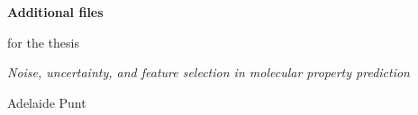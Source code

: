 \documentclass[a4paper,11pt]{report}
\begin{document}
\begin{titlepage}
\centering
\vspace*{3cm}
{\LARGE \textbf{Additional files}\par}
\vspace{1.5cm}
{\large for the thesis\par}
\vspace{0.4cm}
{\Large \textit{Noise, uncertainty, and feature selection in molecular property prediction}\par}
\vspace{1.5cm}
{\Large Adelaide Punt\par}
\vfill
\end{titlepage}
\tableofcontents


\makeatletter{}\@undefined\makeatother



\end{document}
